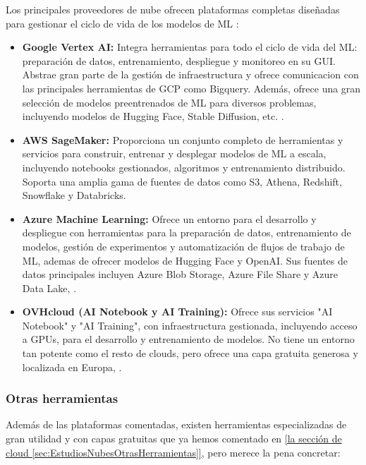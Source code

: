 Los principales proveedores de nube ofrecen plataformas completas diseñadas para gestionar el ciclo de vida de los modelos de ML \citep{comparisonAutoMLServices}:
\begin{itemize}
	\item \textbf{Google Vertex AI:} Integra herramientas para todo el ciclo de vida del ML: preparación de datos, entrenamiento, despliegue y monitoreo en su GUI. Abstrae gran parte de la gestión de infraestructura y ofrece comunicacion con las principales herramientas de GCP como Bigquery. Además, ofrece una gran selección de modelos preentrenados de ML para diversos problemas, incluyendo modelos de Hugging Face, Stable Diffusion, etc. \citep{GoogleVertexAI_CloudIA} .
	\item \textbf{AWS SageMaker:} Proporciona un conjunto completo de herramientas y servicios para construir, entrenar y desplegar modelos de ML a escala, incluyendo notebooks gestionados, algoritmos y entrenamiento distribuido. Soporta una amplia gama de fuentes de datos como S3, Athena, Redshift, Snowflake y Databricks\citep{AmazonSageMaker_CloudIA}.
	\item \textbf{Azure Machine Learning:} Ofrece un entorno para el desarrollo y despliegue con herramientas para la preparación de datos, entrenamiento de modelos, gestión de experimentos y automatización de flujos de trabajo de ML, ademas de ofrecer modelos de Hugging Face y OpenAI. Sus fuentes de datos principales incluyen Azure Blob Storage, Azure File Share y Azure Data Lake, \citep{AzureMachineLearning_CloudIA}.
	\item \textbf{OVHcloud (AI Notebook y AI Training):} Ofrece sus servicios "AI Notebook" y "AI Training", con infraestructura gestionada, incluyendo acceso a GPUs, para el desarrollo y entrenamiento de modelos. No tiene un entorno tan potente como el resto de clouds, pero ofrece una capa gratuita generosa y localizada en Europa, \citep{OVHcloud_CloudIA}.

\end{itemize}

\subsubsection{Otras herramientas}

Además de las plataformas comentadas, existen herramientas especializadas de gran utilidad y con capas gratuitas que ya hemos comentado en  \hyperref[sec:EstudiosNubesOtrasHerramientas]{[la sección de cloud \ref*{sec:EstudiosNubesOtrasHerramientas}]}, pero merece la pena concretar:
 
